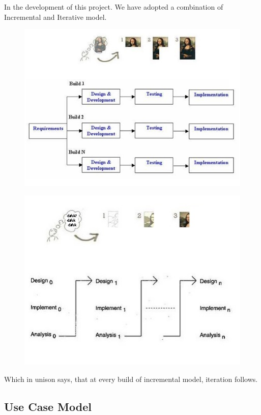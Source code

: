 In the development of this project. We have adopted a combination of Incremental and Iterative model.
\begin{figure}[h]
	\centering
	\includegraphics[height=0.35\textheight]{fig01/l_incre}
	\label{fig:RHP01}

\end{figure}
\begin{figure}[h]
	\centering
	\includegraphics[height=0.35\textheight]{fig01/l_itera}
	\label{fig:RHP02}
\end{figure}

Which in unison says, that at every build of incremental model, iteration follows.
\FloatBarrier
\newpage
\subsection{Use Case Model}
\label{subsec:subsec03}

